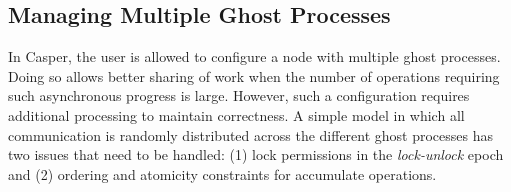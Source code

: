



\subsection{Managing Multiple Ghost Processes}
\label{sec:multi-ghost}

In Casper, the user is allowed to configure a node with multiple ghost
processes.  Doing so allows better sharing of work when the number of
operations requiring such asynchronous progress is large.  However,
such a configuration requires additional processing to maintain
correctness.  A simple model in which all communication is randomly
distributed across the different ghost processes has two issues that
need to be handled: (1) lock permissions in the \emph{lock-unlock}
epoch and (2) ordering and atomicity constraints for accumulate
operations.

